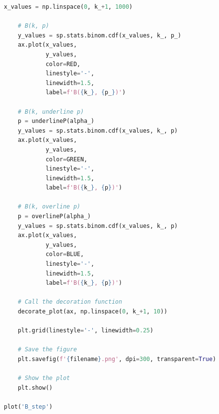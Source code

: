 \documentclass[a4paper, 14pt]{extarticle}
\begin{document}
\begin{center}
\begin{lstlisting}[language=Python]
    x_values = np.linspace(0, k_+1, 1000)
    
    # B(k, p)
    y_values = sp.stats.binom.cdf(x_values, k_, p_)
    ax.plot(x_values, 
            y_values, 
            color=RED, 
            linestyle='-', 
            linewidth=1.5, 
            label=f'B({k_}, {p_})')
    
    # B(k, underline p)
    p = underlineP(alpha_)
    y_values = sp.stats.binom.cdf(x_values, k_, p)
    ax.plot(x_values, 
            y_values, 
            color=GREEN, 
            linestyle='-', 
            linewidth=1.5, 
            label=f'B({k_}, {p})')

    # B(k, overline p)
    p = overlineP(alpha_)
    y_values = sp.stats.binom.cdf(x_values, k_, p)
    ax.plot(x_values, 
            y_values, 
            color=BLUE, 
            linestyle='-', 
            linewidth=1.5, 
            label=f'B({k_}, {p})')

    # Call the decoration function
    decorate_plot(ax, np.linspace(0, k_+1, 10))

    plt.grid(linestyle='-', linewidth=0.25)

    # Save the figure
    plt.savefig(f'{filename}.png', dpi=300, transparent=True)

    # Show the plot
    plt.show()

plot('B_step')
    \end{lstlisting}
\end{center}
\end{document}
